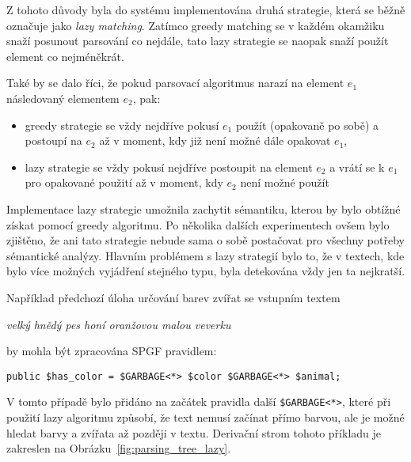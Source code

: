 Z tohoto důvody byla do systému implementována druhá strategie, která se běžně označuje jako \emph{lazy matching}.
Zatímco greedy matching se v každém okamžiku snaží posunout parsování co nejdále, tato lazy strategie se naopak snaží použít element co nejméněkrát.

Také by se dalo říci, že pokud parsovací algoritmus narazí na element $e_{1}$ následovaný elementem $e_{2}$, pak:
\begin{itemize}
	\item greedy strategie se vždy nejdříve pokusí $e_{1}$ použít (opakovaně po sobě) a postoupí na $e_{2}$ až v moment, kdy
	      již není možné dále opakovat $e_{1}$,
	\item lazy strategie se vždy pokusí nejdříve postoupit na element $e_{2}$ a vrátí se k $e_{1}$ pro opakované použití až v moment,
	      kdy $e_{2}$ není možné použít
\end{itemize}

Implementace lazy strategie umožnila zachytit sémantiku, kterou by bylo obtížné získat pomocí greedy algoritmu.
Po několika dalších experimentech ovšem bylo zjištěno, že ani tato strategie nebude sama o sobě postačovat pro všechny potřeby sémantické analýzy.
Hlavním problémem s lazy strategií bylo to, že v textech, kde bylo více možných vyjádření stejného typu, byla detekována vždy jen ta nejkratší.

\newpage
Například předchozí úloha určování barev zvířat se vstupním textem
\begin{center}
	\emph{velký hnědý pes honí oranžovou malou veverku}
\end{center}
by mohla být zpracována SPGF pravidlem:
\begin{center}
	\texttt{public \$has\_color = \$GARBAGE<*> \$color \$GARBAGE<*> \$animal;}
\end{center}
V tomto případě bylo přidáno na začátek pravidla další \texttt{\$GARBAGE<*>}, které při použití lazy algoritmu způsobí,
že text nemusí začínat přímo barvou, ale je možné hledat barvy a zvířata až později v textu.
Derivační strom tohoto příkladu je zakreslen na Obrázku~\ref{fig:parsing_tree_lazy}.

